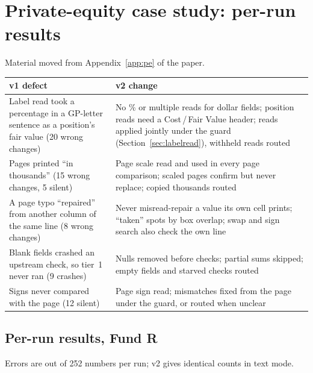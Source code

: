 \section{Private-equity case study: per-run results}\label{sup:pe}
Material moved from Appendix~\ref{app:pe} of the paper.




\clearpage

\label{tab:v1v2}
\begin{center}
\begin{tabularx}{\textwidth}{@{}LL@{}}
\toprule
v1 defect & v2 change \\
\midrule
Label read took a percentage in a GP-letter sentence as a position's fair value (20 wrong changes) & No \% or multiple reads for dollar fields; position reads need a Cost\,/\,Fair Value header; reads applied jointly under the guard (Section~\ref{sec:labelread}), withheld reads routed \\
Pages printed ``in thousands'' (15 wrong changes, 5 silent) & Page scale read and used in every page comparison; scaled pages confirm but never replace; copied thousands routed \\
A page typo ``repaired'' from another column of the same line (8 wrong changes) & Never misread-repair a value its own cell prints; ``taken'' spots by box overlap; swap and sign search also check the own line \\
Blank fields crashed an upstream check, so tier~1 never ran (9 crashes) & Nulls removed before checks; partial sums skipped; empty fields and starved checks routed \\
Signs never compared with the page (12 silent) & Page sign read; mismatches fixed from the page under the guard, or routed when unclear \\
\bottomrule
\end{tabularx}
\end{center}

\subsection{Per-run results, Fund R}\label{app:fundr}

 Errors are out of 252 numbers per run; v2 gives identical counts in text mode.

